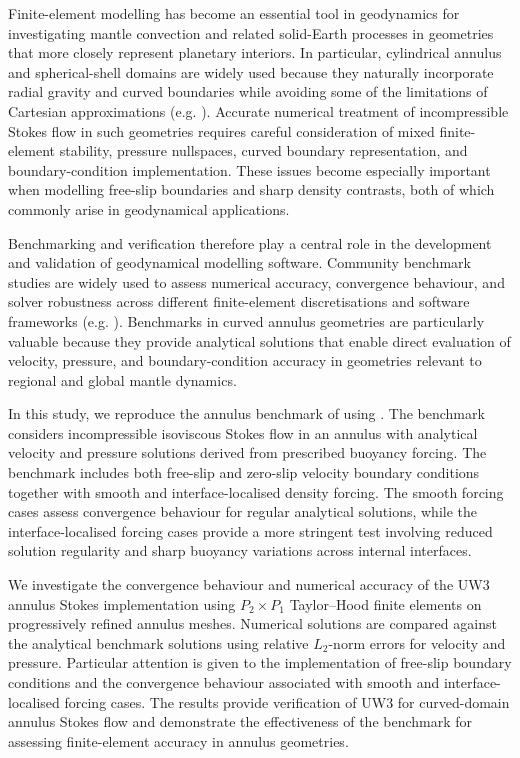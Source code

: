 \documentclass[gmd, manuscript]{copernicus}
\begin{document}
Finite-element modelling has become an essential tool in
geodynamics for investigating mantle convection and related
solid-Earth processes in geometries that more closely
represent planetary interiors. In particular, cylindrical
annulus and spherical-shell domains are widely used because
they naturally incorporate radial gravity and curved
boundaries while avoiding some of the limitations of
Cartesian approximations
(e.g. \citealp{baumgardner1985,jarvis1993,zhong2000,tackley2008,davies2022}).
Accurate numerical treatment of incompressible Stokes flow
in such geometries requires careful consideration of
mixed finite-element stability, pressure nullspaces, curved
boundary representation, and boundary-condition
implementation. These issues become especially important
when modelling free-slip boundaries and sharp density
contrasts, both of which commonly arise in geodynamical
applications.

Benchmarking and verification therefore play a central role
in the development and validation of geodynamical modelling
software. Community benchmark studies are widely used to
assess numerical accuracy, convergence behaviour, and solver
robustness across different finite-element discretisations
and software frameworks
(e.g. \citealp{blankenbach1989,busse1994,king2010,tosi2015,thieulot2018,kramer2021,thieulot2022}).
Benchmarks in curved annulus geometries are particularly
valuable because they provide analytical solutions that
enable direct evaluation of velocity, pressure, and
boundary-condition accuracy in geometries relevant to
regional and global mantle dynamics.

In this study, we reproduce the annulus benchmark of
 using . The benchmark considers
incompressible isoviscous Stokes flow in an annulus with analytical velocity and pressure
solutions derived from prescribed buoyancy forcing. The
benchmark includes both free-slip and zero-slip velocity
boundary conditions together with smooth and
interface-localised density forcing. The smooth forcing
cases assess convergence behaviour for regular analytical
solutions, while the interface-localised forcing cases
provide a more stringent test involving reduced solution
regularity and sharp buoyancy variations across internal
interfaces.

We investigate the convergence behaviour and numerical
accuracy of the UW3 annulus Stokes implementation using
\(P_2\times P_1\) Taylor--Hood finite elements on
progressively refined annulus meshes. Numerical solutions
are compared against the analytical benchmark solutions
using relative \(L_2\)-norm errors for velocity and pressure.
Particular attention is given to the implementation of
free-slip boundary conditions and the convergence behaviour
associated with smooth and interface-localised forcing
cases. The results provide verification of UW3 for
curved-domain annulus Stokes flow and demonstrate the
effectiveness of the  benchmark for assessing
finite-element accuracy in annulus geometries.
\end{document}

